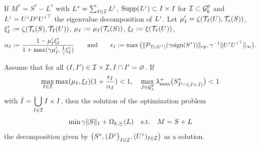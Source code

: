 \documentclass{article}
\begin{document}
\begin{theorem}
\label{theo:two}
If $M^*=S^*-L^*$ with $L^*=\sum_{I \in \mathcal{I}} L^{{\scriptscriptstyle I}}$, ${\rm Supp}(L^{{\scriptscriptstyle I}}) \subset I \times I$ for $\mathcal{I} \subset \mathcal{G}^p_k$ %
and $L^{{\scriptscriptstyle I}}=U^{{\scriptscriptstyle I}} D^{{\scriptscriptstyle I}} {U^{{\scriptscriptstyle I}}}^\top$ the eigenvalue decomposition of $L^{{\scriptscriptstyle I}}$.
Let $\mu'_I=\zeta(\mathcal{T}_I(U),\mathcal{T}_s(S))$, $\xi'_I :=\zeta(\mathcal{T}_s(S),\mathcal{T}_I(U))$, $\mu_I:=\mu_I(\mathcal{T}_s(S))$, $\xi_I:=\xi(\mathcal{T}_I(U))$, 
$$\alpha_I:=\frac{1-\mu'_I\xi'_I}{1+\max(\gamma \mu'_I,\frac{1}{\gamma} \xi'_I)} \qquad \text{and} \qquad \epsilon_I :=\max \big (\|\mathcal{P}_{\mathcal{T}_I(U^{{\scriptscriptstyle I}})}(\gamma \text{sign}(S^*))\|_{{\rm op}}, \gamma^{-1}\|U^{{\scriptscriptstyle I}} {U^{{\scriptscriptstyle I}}}^\top\|_{\infty} \big ).$$

Assume that for all $(I,I') \in \mathcal{I} \times \mathcal{I}, I \cap I'=\varnothing$. If $$\displaystyle\max_{I \in \mathcal{I}} \max(\mu_I,\xi_I) (1+\frac{\epsilon_I}{\alpha_I})<1, \quad \displaystyle \max_{J \in \mathcal{G}^p_k} \lambda_{\max}^+\big (S^*_{\bar{I}^c \cap (J \times J)} \big ) <1$$ %
with $\displaystyle \bar{I}=\bigcup_{I \in \mathcal{I}} I \times I$,
then the solution of the optimization problem $$\displaystyle \min \gamma \|S\|_1+\Omega_{k,\succeq}(L) \quad \text{\text{s.t.}} \quad M=S+L$$
 the decomposition given by $\big (S^*,(D^{{\scriptscriptstyle I}} \big)_{I \in \mathcal{I}},(U^{{\scriptscriptstyle I}})_{I \in \mathcal{I}} \big )$ as a solution.
\end{theorem}
\end{document}
